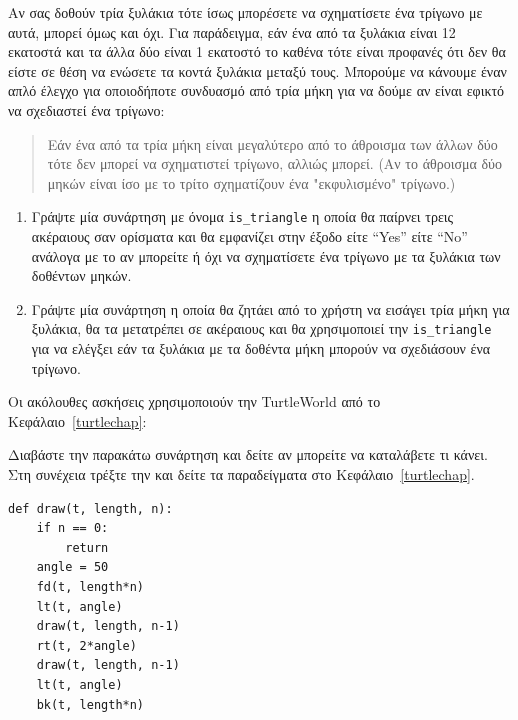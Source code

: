 \documentclass[10pt]{book}
\begin{document}
\begin{exercise}

Αν σας δοθούν τρία ξυλάκια τότε ίσως μπορέσετε να σχηματίσετε ένα τρίγωνο με αυτά, μπορεί όμως και όχι. Για παράδειγμα, εάν ένα από τα ξυλάκια είναι 12 εκατοστά και τα άλλα δύο είναι 1 εκατοστό το καθένα τότε είναι προφανές ότι δεν θα είστε σε θέση να ενώσετε τα κοντά ξυλάκια μεταξύ τους. Μπορούμε να κάνουμε έναν απλό έλεγχο για οποιοδήποτε συνδυασμό από τρία μήκη για να δούμε αν είναι εφικτό να σχεδιαστεί ένα τρίγωνο:

\begin{quotation}

Εάν ένα από τα τρία μήκη είναι μεγαλύτερο από το άθροισμα των άλλων δύο 
τότε δεν μπορεί να σχηματιστεί τρίγωνο, αλλιώς μπορεί. (Αν το άθροισμα δύο μηκών είναι ίσο με το τρίτο σχηματίζουν ένα "εκφυλισμένο" τρίγωνο.)
\end{quotation}

\begin{enumerate}


\item Γράψτε μία συνάρτηση με όνομα  \verb"is_triangle"  η οποία θα
  παίρνει τρεις ακέραιους σαν ορίσματα και θα εμφανίζει στην έξοδο είτε 
  ``Yes'' είτε ``No'' ανάλογα με το αν μπορείτε ή όχι να σχηματίσετε
  ένα τρίγωνο με τα ξυλάκια των δοθέντων μηκών.

\item Γράψτε μία συνάρτηση η οποία θα ζητάει από το χρήστη να εισάγει τρία
  μήκη για ξυλάκια, θα τα μετατρέπει σε ακέραιους και θα χρησιμοποιεί την 
  \verb"is_triangle"  για να ελέγξει εάν τα ξυλάκια με τα δοθέντα μήκη
  μπορούν να σχεδιάσουν ένα τρίγωνο.\\

\end{enumerate}

\end{exercise}
Οι ακόλουθες ασκήσεις χρησιμοποιούν την  TurtleWorld  από το Κεφάλαιο~\ref{turtlechap}:\\


\begin{exercise}

Διαβάστε την παρακάτω συνάρτηση και δείτε αν μπορείτε να καταλάβετε τι κάνει.
Στη συνέχεια τρέξτε την και δείτε τα παραδείγματα στο Κεφάλαιο~\ref{turtlechap}.

\begin{verbatim}
def draw(t, length, n):
    if n == 0:
        return
    angle = 50
    fd(t, length*n)
    lt(t, angle)
    draw(t, length, n-1)
    rt(t, 2*angle)
    draw(t, length, n-1)
    lt(t, angle)
    bk(t, length*n)
\end{verbatim}

\end{exercise}
\end{document}
